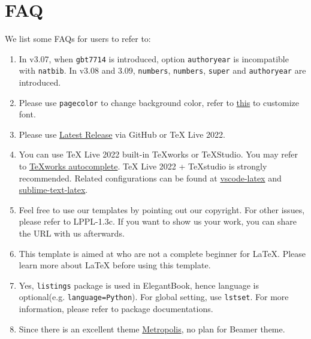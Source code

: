 \documentclass[11pt,bibend=bibtex]{elegantbook}
\begin{document}
\chapter{FAQ}
We list some FAQs for users to refer to:
\begin{enumerate}
  \item {}
  In v3.07, when \lstinline{gbt7714} is introduced, option \lstinline{authoryear} is incompatible with \lstinline{natbib}. In v3.08 and 3.09, \lstinline{numbers}, \lstinline{numbers}, \lstinline{super} and \lstinline{authoryear} are introduced.
  \item {}
  Please use \lstinline{pagecolor} to change background color, refer to \href{https://tex.stackexchange.com/questions/278544/xcolor-what-is-the-equivalent-of-default-text-color}{this} to customize font.
  \item {}
  Please use \href{https://github.com/ElegantLaTeX/ElegantBook/releases}{Latest Release} via GitHub or \TeX{} Live 2022.
  \item {}
  You can use \TeX{} Live 2022 built-in \TeX works or \TeX Studio. You may refer to \href{https://github.com/EthanDeng/texworks-autocomplete}{\TeX{}works autocomplete}. \TeX{} Live 2022 + \TeX{}studio is strongly recommended. Related configurations can be found at \href{https://github.com/EthanDeng/vscode-latex}{vscode-latex} and \href{https://github.com/EthanDeng/sublime-text-latex}{sublime-text-latex}.
  \item {}
  Feel free to use our templates by pointing out our copyright. For other issues, please refer to LPPL-1.3c. If you want to show us your work, you can share the URL with us afterwards.
  \item {}
  This template is aimed at who are not a complete beginner for \LaTeX{}. Please learn more about \LaTeX{} before using this template.
  \item {}
  Yes, \lstinline{listings} package is used in ElegantBook, hence language is optional(e.g. \lstinline{language=Python}). For global setting, use \lstinline{lstset}. For more information, please refer to package documentations.
  \item {}
  Since there is an excellent theme \href{https://github.com/matze/mtheme}{Metropolis}, no plan for Beamer theme.
\end{enumerate}
\end{document}
